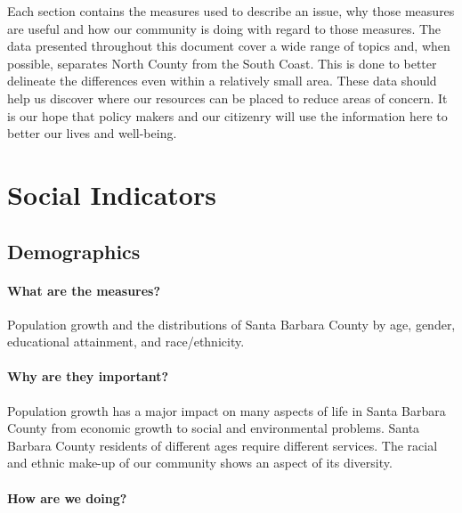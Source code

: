\documentclass[]{book}
\theoremstyle{definition}
\theoremstyle{definition}
\theoremstyle{definition}
\theoremstyle{remark}
\begin{document}
Each section contains the measures used to describe an issue, why those
measures are useful and how our community is doing with regard to those
measures. The data presented throughout this document cover a wide range
of topics and, when possible, separates North County from the South
Coast. This is done to better delineate the differences even within a
relatively small area. These data should help us discover where our
resources can be placed to reduce areas of concern. It is our hope that
policy makers and our citizenry will use the information here to better
our lives and well-being.

\chapter*{Social Indicators}\label{social-indicators}

\section*{Demographics}\label{demographics}

\subsubsection*{What are the measures?}\label{what-are-the-measures}

Population growth and the distributions of Santa Barbara County by age,
gender, educational attainment, and race/ethnicity.

\subsubsection*{Why are they important?}\label{why-are-they-important}

Population growth has a major impact on many aspects of life in Santa
Barbara County from economic growth to social and environmental
problems. Santa Barbara County residents of different ages require
different services. The racial and ethnic make-up of our community shows
an aspect of its diversity.

\subsubsection*{How are we doing?}\label{how-are-we-doing}
\end{document}
